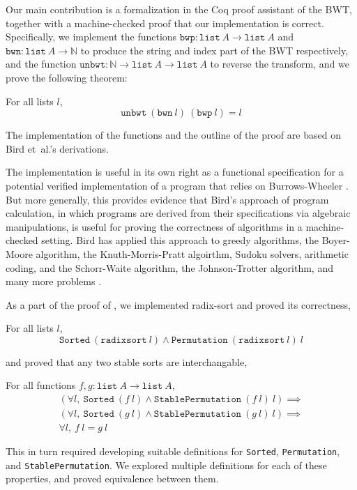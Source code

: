 \documentclass[11pt]{thesis}
\begin{document}
Our main contribution is a formalization in the Coq proof assistant of
the BWT, together with a machine-checked proof that our implementation
is correct. Specifically, we implement the functions
$\mathtt{bwp} : \mathtt{list}~A \to \mathtt{list}~A$ and
$\mathtt{bwn} : \mathtt{list}~A \to \mathbb{N}$ to produce the string
and index part of the BWT respectively, and the function
$\mathtt{unbwt} : \mathbb{N} \to \mathtt{list}~A \to \mathtt{list}~A$ to
reverse the transform, and we prove the following theorem:
\begin{theorem}
  \label{thm:unbwt_correct}
  For all lists $l$,
  \begin{equation*}
    \mathtt{unbwt}~(\mathtt{bwn}~l)~(\mathtt{bwp}~l) = l
  \end{equation*}
\end{theorem}
The implementation of the functions and the outline of the proof are
based on Bird et~al.'s derivations.

The implementation is useful in its own right as a functional
specification for a potential verified implementation of a program
that relies on Burrows-Wheeler \cite{appel-func-spec}. But more
generally, this provides evidence that Bird's approach of program
calculation, in which programs are derived from their specifications
via algebraic manipulations, is useful for proving the correctness of
algorithms in a machine-checked setting. Bird has applied this
approach to greedy algorithms, the Boyer-Moore algorithm, the
Knuth-Morris-Pratt algoirthm, Sudoku solvers, arithmetic coding, and
the Schorr-Waite algorithm, the Johnson-Trotter algorithm, and many
more problems \cite{pearls}.

As a part of the proof of , we implemented
radix-sort and proved its correctness,
\begin{theorem}
  \label{thm:radixsort_correct}%
  For all lists $l$,
  \begin{equation*}
    \mathtt{Sorted}~(\mathtt{radixsort}~l) \land \mathtt{Permutation}~(\mathtt{radixsort}~l)~l
  \end{equation*}
\end{theorem}
and proved that any two stable sorts are interchangable,
\begin{theorem}
  \label{thm:radixsort_correct}%
  For all functions $f, g : \mathtt{list}~A \to \mathtt{list}~A$,
  \begin{gather*}
    (\forall l,~\mathtt{Sorted}~(f~l) \land \mathtt{StablePermutation}~(f~l)~l) \implies \\
    (\forall l,~\mathtt{Sorted}~(g~l) \land \mathtt{StablePermutation}~(g~l)~l) \implies \\
    \forall l,~f~l = g~l
  \end{gather*}
\end{theorem}
This in turn required developing suitable definitions for
\texttt{Sorted}, \texttt{Permutation}, and \texttt{StablePermutation}.
We explored multiple definitions for each of these properties, and
proved equivalence between them.
\end{document}
